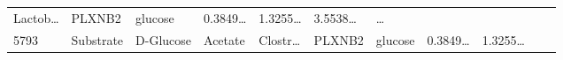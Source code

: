 \documentclass[
]{article}
\begin{document}
\begin{longtable}[]{@{}lllllllllll@{}}
\begin{minipage}[t]{0.07\columnwidth}
Lactob\ldots{}\strut
\end{minipage} & \begin{minipage}[t]{0.07\columnwidth}\raggedright
PLXNB2\strut
\end{minipage} & \begin{minipage}[t]{0.09\columnwidth}\raggedright
glucose\strut
\end{minipage} & \begin{minipage}[t]{0.07\columnwidth}\raggedright
0.3849\ldots{}\strut
\end{minipage} & \begin{minipage}[t]{0.07\columnwidth}\raggedright
1.3255\ldots{}\strut
\end{minipage} & \begin{minipage}[t]{0.07\columnwidth}\raggedright
3.5538\ldots{}\strut
\end{minipage} & \begin{minipage}[t]{0.03\columnwidth}\raggedright
\ldots{}\strut
\end{minipage}\tabularnewline
\begin{minipage}[t]{0.03\columnwidth}\raggedright
5793\strut
\end{minipage} & \begin{minipage}[t]{0.07\columnwidth}\raggedright
Substrate\strut
\end{minipage} & \begin{minipage}[t]{0.07\columnwidth}\raggedright
D-Glucose\strut
\end{minipage} & \begin{minipage}[t]{0.09\columnwidth}\raggedright
Acetate\strut
\end{minipage} & \begin{minipage}[t]{0.07\columnwidth}\raggedright
Clostr\ldots{}\strut
\end{minipage} & \begin{minipage}[t]{0.07\columnwidth}\raggedright
PLXNB2\strut
\end{minipage} & \begin{minipage}[t]{0.09\columnwidth}\raggedright
glucose\strut
\end{minipage} & \begin{minipage}[t]{0.07\columnwidth}\raggedright
0.3849\ldots{}\strut
\end{minipage} & \begin{minipage}[t]{0.07\columnwidth}\raggedright
1.3255\ldots{}\strut
\end{minipage} & \begin{minipage}[t]{0.07\columnwidth}\raggedright

\end{minipage}
\end{longtable}
\end{document}
